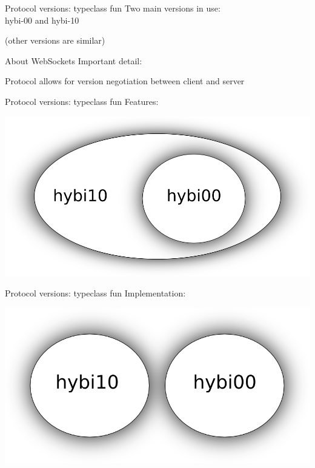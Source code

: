 \documentclass[20pt]{beamer}
\newcommand{\vspaced}{
    \vspace{5mm}
}
\begin{document}
\begin{frame}{Protocol versions: typeclass fun}
    Two main versions in use: \\
    hybi-00 and hybi-10 \\
    \vspaced
    \small{(other versions are similar)} \\
\end{frame}

\begin{frame}{About WebSockets}
    Important detail: \\
    \vspaced
    Protocol allows for version negotiation between client and server
\end{frame}

\begin{frame}{Protocol versions: typeclass fun}
    Features:
    \begin{center}
    \includegraphics[width=\textwidth]{images/features.png}
    \end{center}
\end{frame}

\begin{frame}{Protocol versions: typeclass fun}
    Implementation:
    \begin{center}
    \includegraphics[width=\textwidth]{images/implementation.png}
    \end{center}
\end{frame}
\end{document}
